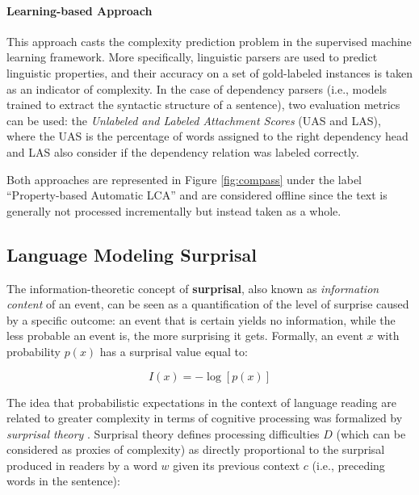 \documentclass[a4paper, nobind]{templates/ociamthesis}
\begin{document}
\paragraph{Learning-based Approach} This approach casts the complexity prediction problem in the supervised machine learning framework. More specifically, linguistic parsers are used to predict linguistic properties, and their accuracy on a set of gold-labeled instances is taken as an indicator of complexity. In the case of dependency parsers (i.e., models trained to extract the syntactic structure of a sentence), two evaluation metrics can be used: the \emph{Unlabeled and Labeled Attachment Scores} (UAS and LAS), where the UAS is the percentage of words assigned to the right dependency head and LAS also consider if the dependency relation was labeled correctly.

Both approaches are represented in Figure \ref{fig:compass} under the label ``Property-based Automatic LCA'' and are considered offline since the text is generally not processed incrementally but instead taken as a whole.

\hypertarget{subsubchap:lm-surprisal}{%
\subsection{Language Modeling Surprisal}\label{subsubchap:lm-surprisal}}

The information-theoretic concept of \textbf{surprisal}, also known as \emph{information content} of an event, can be seen as a quantification of the level of surprise caused by a specific outcome: an event that is certain yields no information, while the less probable an event is, the more surprising it gets. Formally, an event \(x\) with probability \(p(x)\) has a surprisal value equal to:

\begin{equation}
I(x) = - \log[p(x)]
\end{equation}

The idea that probabilistic expectations in the context of language reading are related to greater complexity in terms of cognitive processing was formalized by \emph{surprisal theory} \autocites{hale-2001-probabilistic}{hale-2016-information}. Surprisal theory defines processing difficulties \(D\) (which can be considered as proxies of complexity) as directly proportional to the surprisal produced in readers by a word \(w\) given its previous context \(c\) (i.e., preceding words in the sentence):
\end{document}
